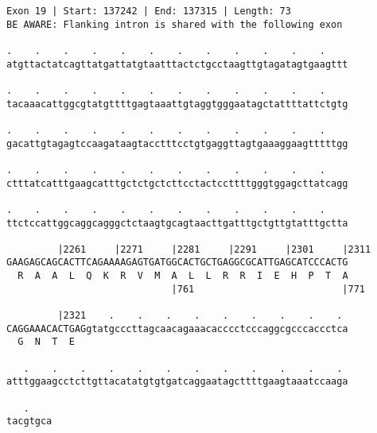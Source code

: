 \documentclass{article}
\begin{document}
\newpage
\begin{Verbatim}
Exon 19 | Start: 137242 | End: 137315 | Length: 73
BE AWARE: Flanking intron is shared with the following exon
 
.    .    .    .    .    .    .    .    .    .    .    .    
atgttactatcagttatgattatgtaatttactctgcctaagttgtagatagtgaagttt
  
.    .    .    .    .    .    .    .    .    .    .    .    
tacaaacattggcgtatgttttgagtaaattgtaggtgggaatagctattttattctgtg
  
.    .    .    .    .    .    .    .    .    .    .    .    
gacattgtagagtccaagataagtacctttcctgtgaggttagtgaaaggaagtttttgg
  
.    .    .    .    .    .    .    .    .    .    .    .    
ctttatcatttgaagcatttgctctgctcttcctactccttttgggtggagcttatcagg
  
.    .    .    .    .    .    .    .    .    .    .    .    
ttctccattggcaggcagggctctaagtgcagtaacttgatttgctgttgtatttgctta
  
         |2261     |2271     |2281     |2291     |2301     |2311
GAAGAGCAGCACTTCAGAAAAGAGTGATGGCACTGCTGAGGCGCATTGAGCATCCCACTG
  R  A  A  L  Q  K  R  V  M  A  L  L  R  R  I  E  H  P  T  A
                             |761                          |771
  
         |2321    .    .    .    .    .    .    .    .    . 
CAGGAAACACTGAGgtatgcccttagcaacagaaacacccctcccaggcgcccaccctca
  G  N  T  E                                                
  
   .    .    .    .    .    .    .    .    .    .    .    . 
atttggaagcctcttgttacatatgtgtgatcaggaatagcttttgaagtaaatccaaga
  
   .    
tacgtgca
\end{Verbatim}
\newpage
\end{document}
